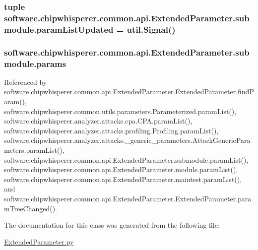 \subsubsection[{param\+List\+Updated}]{\setlength{\rightskip}{0pt plus 5cm}tuple software.\+chipwhisperer.\+common.\+api.\+Extended\+Parameter.\+submodule.\+param\+List\+Updated = util.\+Signal()\hspace{0.3cm}{\ttfamily [static]}}\label{classsoftware_1_1chipwhisperer_1_1common_1_1api_1_1ExtendedParameter_1_1submodule_a02d315e3ee5282309c002f2442904b5f}
\hypertarget{classsoftware_1_1chipwhisperer_1_1common_1_1api_1_1ExtendedParameter_1_1submodule_aed67fc3a0e1ad3bfe2ac4445a7d4c54c}{}
\subsubsection[{params}]{\setlength{\rightskip}{0pt plus 5cm}software.\+chipwhisperer.\+common.\+api.\+Extended\+Parameter.\+submodule.\+params}\label{classsoftware_1_1chipwhisperer_1_1common_1_1api_1_1ExtendedParameter_1_1submodule_aed67fc3a0e1ad3bfe2ac4445a7d4c54c}


Referenced by software.\+chipwhisperer.\+common.\+api.\+Extended\+Parameter.\+Extended\+Parameter.\+find\+Param(), software.\+chipwhisperer.\+common.\+utils.\+parameters.\+Parameterized.\+param\+List(), software.\+chipwhisperer.\+analyzer.\+attacks.\+cpa.\+C\+P\+A.\+param\+List(), software.\+chipwhisperer.\+analyzer.\+attacks.\+profiling.\+Profiling.\+param\+List(), software.\+chipwhisperer.\+analyzer.\+attacks.\+\_\+generic\+\_\+parameters.\+Attack\+Generic\+Parameters.\+param\+List(), software.\+chipwhisperer.\+common.\+api.\+Extended\+Parameter.\+submodule.\+param\+List(), software.\+chipwhisperer.\+common.\+api.\+Extended\+Parameter.\+module.\+param\+List(), software.\+chipwhisperer.\+common.\+api.\+Extended\+Parameter.\+maintest.\+param\+List(), and software.\+chipwhisperer.\+common.\+api.\+Extended\+Parameter.\+Extended\+Parameter.\+param\+Tree\+Changed().



The documentation for this class was generated from the following file\+:\begin{DoxyCompactItemize}
\item 
\hyperlink{ExtendedParameter_8py}{Extended\+Parameter.\+py}\end{DoxyCompactItemize}
